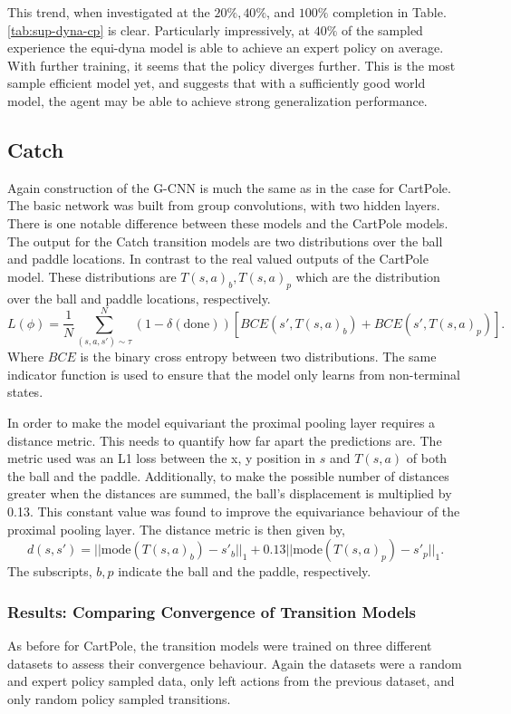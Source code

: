 This trend, when investigated at the $20\%, 40\%$, and $100\%$ completion in Table.\ref{tab:sup-dyna-cp} is clear. Particularly impressively, at $40\%$ of the sampled experience the equi-dyna model is able to achieve an expert policy on average. With further training, it seems that the policy diverges further. This is the most sample efficient model yet, and suggests that with a sufficiently good world model, the agent may be able to achieve strong generalization performance.
\subsection{Catch}

Again construction of the G-CNN is much the same as in the case for CartPole. The basic network was built from group convolutions, with two hidden layers. There is one notable difference between these models and the CartPole models. The output for the Catch transition models are two distributions over the ball and paddle locations. In contrast to the real valued outputs of the CartPole model. These distributions are $T(s, a)_b, T(s, a)_p$ which are the distribution over the ball and paddle locations, respectively.
\begin{equation}
	L(\phi) = \frac{1}{N}\sum_{(s, a, s') \sim \tau}^N(1- \delta (\text{done}))\left[BCE(s', T(s, a)_b) + BCE(s', T(s, a)_p)\right] .
\end{equation}
Where $BCE$ is the binary cross entropy between two distributions. The same indicator function is used to ensure that the model only learns from non-terminal states.

In order to make the model equivariant the proximal pooling layer requires  a distance metric. This needs to quantify how far apart the predictions are. The metric used was an L1 loss between the x, y position in $s$ and $T(s,a)$ of both the ball and the paddle. Additionally, to make the possible number of distances greater when the distances are summed, the ball's displacement is multiplied by 0.13. This constant value was found to improve the equivariance behaviour of the proximal pooling layer. The distance metric is then given by,
\begin{equation}
	d(s, s') = ||\text{mode}(T(s, a)_b) - s'_b||_1 + 0.13 ||\text{mode}(T(s, a)_p )- s'_p||_1.
\end{equation}
The subscripts, $b, p$ indicate the ball and the paddle, respectively.

\subsubsection{Results: Comparing Convergence of Transition Models}
As before for CartPole, the transition models were trained on three different datasets to assess their convergence behaviour. Again the datasets were a random and expert policy sampled data, only left actions from the previous dataset, and only random policy sampled transitions.

